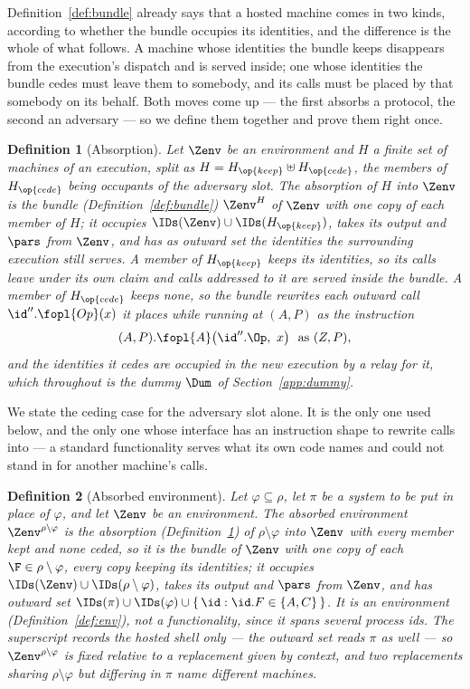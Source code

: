 \documentclass[10pt,oneside,openany]{book}
\theoremstyle{accentdef}
\newtheorem{definition}{Definition}[chapter]
\theoremstyle{accentplain}
\begin{document}
Definition~\ref{def:bundle} already says that a hosted machine comes in two kinds, according to
whether the bundle occupies its identities, and the difference is the whole of what follows. A
machine whose identities the bundle keeps disappears from the execution's dispatch and is served
inside; one whose identities the bundle cedes must leave them to somebody, and its calls must be
placed by that somebody on its behalf. Both moves come up --- the first absorbs a protocol, the
second an adversary --- so we define them together and prove them right once.

\begin{definition}[Absorption]\label{def:absorption}
Let $\Zenv$ be an environment and $H$ a finite set of machines of an execution, split as
$H = H_{\op{keep}} \uplus H_{\op{cede}}$, the members of $H_{\op{cede}}$ being occupants of the
adversary slot. The \emph{absorption} of $H$ into $\Zenv$ is the bundle
(Definition~\ref{def:bundle}) $\Zenv^{H}$ of $\Zenv$ with one copy of each member of $H$; it
occupies $\IDs(\Zenv) \cup \IDs(H_{\op{keep}})$, takes its output and $\pars$ from $\Zenv$, and has
as outward set the identities the surrounding execution still serves. A member of $H_{\op{keep}}$
keeps its identities, so its calls leave under its own claim and calls addressed to it are served
inside the bundle. A member of $H_{\op{cede}}$ keeps none, so the bundle rewrites each outward call
$\id''.\fopl{Op}(x)$ it places while running at $(A,P)$ as the instruction
\[
  (A,P).\fopl{A}\bigl(\id''.\Op,\ x\bigr) \ \text{ as } (Z,P) ,
\]
and the identities it cedes are occupied in the new execution by a \emph{relay} for it, which
throughout is the dummy $\Dum$ of Section~\ref{app:dummy}.
\end{definition}

We state the ceding case for the adversary slot alone. It is the only one used below, and the only
one whose interface has an instruction shape to rewrite calls into --- a standard functionality
serves what its own code names and could not stand in for another machine's calls.

\begin{definition}[Absorbed environment]\label{def:absorb}
Let $\varphi \subseteq \rho$, let $\pi$ be a system to be put in place of $\varphi$, and let
$\Zenv$ be an environment. The \emph{absorbed} environment $\Zenv^{\rho \setminus \varphi}$ is the
absorption (Definition~\ref{def:absorption}) of $\rho \setminus \varphi$ into $\Zenv$ with every
member kept and none ceded, so it is the
bundle of $\Zenv$ with one copy of each $\F \in \rho \setminus
\varphi$, every copy keeping its identities; it occupies
$\IDs(\Zenv) \cup \IDs(\rho \setminus \varphi)$, takes its output and $\pars$ from $\Zenv$, and has
outward set $\IDs(\pi) \cup \IDs(\varphi) \cup \{\, \id : \id.F \in \{A,C\} \,\}$. It is an
environment (Definition~\ref{def:env}), not a functionality, since it spans several process ids.
The superscript records the hosted shell only --- the outward set reads $\pi$ as well --- so
$\Zenv^{\rho \setminus \varphi}$ is fixed relative to a replacement given by context, and two
replacements sharing $\rho \setminus \varphi$ but differing in $\pi$ name different machines.
\end{definition}
\end{document}
